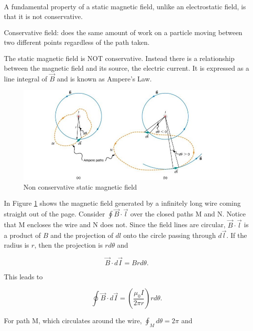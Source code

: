 \documentclass[14pt]{memoir}
\begin{document}
A fundamental property of a static magnetic field, unlike an electrostatic field, is that it is not conservative. 

Conservative field: does the same amount of work on a particle moving between two different points regardless of the path taken.

The static magnetic field is NOT conservative. Instead there is a relationship between the magnetic field and its source, the electric current. It is expressed as a line integral of $\vec{B}$ and is known as Ampere's Law. 

\begin{figure}[H]
\begin{center}
\includegraphics[scale=0.7]{fig/fig_12_14.jpg}
\caption{Non conservative static magnetic field}
\label{fig:12_14}
\end{center}
\end{figure}

In Figure \ref{fig:12_14} shows the magnetic field generated by a infinitely long wire coming straight out of the page. Consider $\oint \vec{B} \cdot \vec{l}$ over the closed paths M and N. Notice that M encloses the wire and N does not. Since the field lines are circular, $\vec{B} \cdot \vec{l}$ is a product of $B$ and the projection of $dl$ onto the circle passing through $d\vec{l}$. If the radius is $r$, then the projection is $r d\theta$ and 

\begin{equation}
\vec{B} \cdot d\vec{I} = B r d\theta.
\end{equation}

This leads to 

\begin{equation}
\oint \vec{B} \cdot d\vec{I} = (\frac{\mu_0 I}{2\pi r}) r d\theta.
\end{equation}

For path M, which circulates around the wire, $\oint_M d\theta = 2 \pi$ and 
\end{document}
